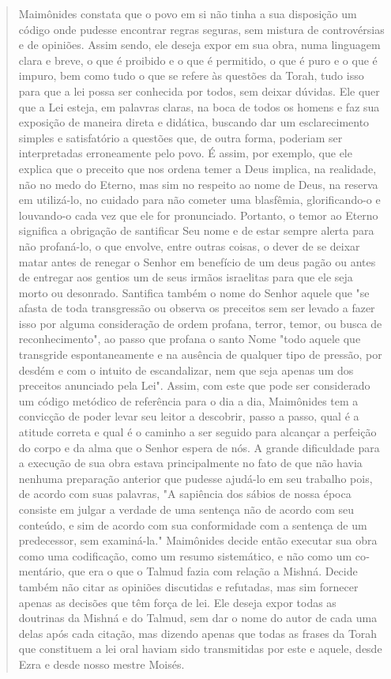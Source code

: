 \begin{quote}
Maimônides constata que o povo em si não tinha a sua disposição um
código onde pudesse encontrar regras seguras, sem mistura de
controvér­sias e de opiniões. Assim sendo, ele deseja expor em sua obra,
numa linguagem clara e breve, o que é proibido e o que é permitido, o
que é puro e o que é impuro, bem como tudo o que se refere às questões
da Torah, tudo isso para que a lei possa ser conhecida por todos, sem
deixar dúvidas. Ele quer que a Lei esteja, em palavras claras, na boca
de todos os homens e faz sua exposição de maneira direta e didática,
buscando dar um esclarecimento simples e satisfa­tório a questões que,
de outra forma, poderiam ser interpretadas erroneamente pelo povo. É
assim, por exemplo, que ele explica que o preceito que nos orde­na temer
a Deus implica, na realidade, não no medo do Eterno, mas sim no respeito
ao nome de Deus, na reserva em utilizá-lo, no cuidado para não come­ter
uma blasfêmia, glorificando-o e louvando-o cada vez que ele for
pronuncia­do. Portanto, o temor ao Eterno significa a obrigação de
santificar Seu nome e de estar sempre alerta para não profaná-lo, o que
envolve, entre outras coi­sas, o dever de se deixar matar antes de
renegar o Senhor em benefício de um deus pagão ou antes de entregar aos
gentios um de seus irmãos israelitas para que ele seja morto ou
desonrado. Santifica também o nome do Senhor aquele que "se afasta de
toda transgressão ou observa os preceitos sem ser levado a fazer isso
por alguma consideração de ordem profana, terror, temor, ou busca de
reconhecimento", ao passo que profana o santo Nome "todo aquele que
transgride espontaneamente e na ausência de qualquer tipo de pressão,
por des­dém e com o intuito de escandalizar, nem que seja apenas um dos
preceitos anunciado pela Lei". Assim, com este que pode ser considerado
um código me­tódico de referência para o dia a dia, Maimônides tem a
convicção de poder levar seu leitor a descobrir, passo a passo, qual é a
atitude correta e qual é o caminho a ser seguido para alcançar a
perfeição do corpo e da alma que o Se­nhor espera de nós.
A grande dificuldade para a execução de sua obra estava principal­mente
no fato de que não havia nenhuma preparação anterior que pudesse
aju­dá-lo em seu trabalho pois, de acordo com suas palavras, "A
sapiência dos sá­bios de nossa época consiste em julgar a verdade de uma
sentença não de acor­do com seu conteúdo, e sim de acordo com sua
conformidade com a sentença de um predecessor, sem examiná-la."
Maimônides decide então executar sua obra como uma codificação, como um
resumo sistemático, e não como um co­mentário, que era o que o Talmud
fazia com relação a Mishná. Decide também não citar as opiniões
discutidas e refutadas, mas sim fornecer apenas as deci­sões que têm
força de lei. Ele deseja expor todas as doutrinas da Mishná e do Talmud,
sem dar o nome do autor de cada uma delas após cada citação, mas dizendo
apenas que todas as frases da Torah que constituem a lei oral haviam
sido transmitidas por este e aquele, desde Ezra e desde nosso mestre
Moisés.


\end{quote}
